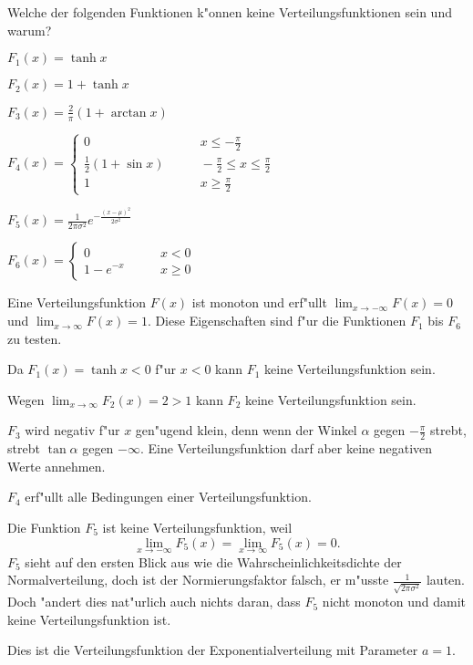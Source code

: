 Welche der folgenden Funktionen k"onnen keine Verteilungsfunktionen sein
und warum?
\begin{teilaufgaben}
\item $F_1(x)=\tanh x$
\item $F_2(x)=1+\tanh x$
\item $F_3(x)=\frac2{\pi}(1+\arctan x)$
\item $F_4(x)=\begin{cases}
0&\qquad x\le -\frac{\pi}2\\
\frac12(1+\sin x)&\qquad-\frac{\pi}2\le x\le \frac{\pi}2\\
1&\qquad x\ge \frac{\pi}2
\end{cases}$
\item $F_5(x)=\frac1{2\pi\sigma^2}e^{-\frac{(x-\mu)^2}{2\sigma^2}}$
\item $F_6(x)=\begin{cases}0&\qquad x<0\\1-e^{-x}&\qquad x\ge 0\end{cases}$
\end{teilaufgaben}

\begin{loesung}
Eine Verteilungsfunktion $F(x)$ ist monoton und erf"ullt
$\lim_{x\to-\infty}F(x)=0$
und
$\lim_{x\to\infty}F(x)=1$. Diese Eigenschaften sind f"ur die
Funktionen $F_1$ bis $F_6$ zu testen.
\begin{teilaufgaben}
\item Da $F_1(x)=\tanh x<0$ f"ur $x<0$ kann $F_1$ keine Verteilungsfunktion sein.
\item Wegen $\lim_{x\to\infty}F_2(x)=2>1$ kann $F_2$ keine Verteilungsfunktion sein.
\item $F_3$ wird negativ f"ur $x$ gen"ugend klein, denn wenn der Winkel
$\alpha$ gegen $-\frac{\pi}2$ strebt, strebt $\tan\alpha$ gegen $-\infty$.
Eine Verteilungsfunktion darf aber keine negativen Werte annehmen.
\item $F_4$ erf"ullt alle Bedingungen einer Verteilungsfunktion.
\item Die Funktion $F_5$ ist keine Verteilungsfunktion, weil
\[
\lim_{x\to-\infty}F_5(x)=\lim_{x\to\infty}F_5(x)=0.
\]
$F_5$ sieht auf den ersten
Blick aus wie die Wahrscheinlichkeitsdichte der Normalverteilung, doch ist
der Normierungsfaktor falsch, er m"usste $\frac1{\sqrt{2\pi\sigma^2}}$ lauten.
Doch "andert dies nat"urlich auch nichts daran, dass $F_5$ nicht monoton und damit
keine Verteilungsfunktion ist.
\item Dies ist die Verteilungsfunktion der Exponentialverteilung mit Parameter $a=1$.
\qedhere
\end{teilaufgaben}
\end{loesung}

